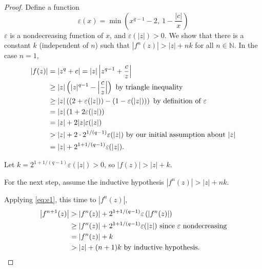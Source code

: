 \documentclass[11pt]{article}
\begin{document}
\begin{proof}
Define a function
\[
\varepsilon(x) = \min\left(x^{q-1} - 2,\ 1 - \frac{|c|}{x}\right)
\]
\( \varepsilon \) is a nondecreasing function of \( x \), and \( \varepsilon(|z|) > 0 \).
We show that there is a constant \( k \) (independent of \( n \)) such that
\( |f^n(z)| > |z| + n k \) for all \( n \in \mathbb{N} \). In the case \( n = 1 \),
\begin{equation} \label{eq:e1}
\begin{aligned}
|f(z)| &= \left| z^q + c \right| = |z| \left| z^{q-1} + \frac{c}{z} \right| \\
&\geq |z| \left( |z|^{q-1} - {\left|\frac{c}{z}\right|} \right) \text{ by triangle inequality} \\
&\geq |z| \left( \left(2 + \varepsilon(|z|) \right) - \left(1 - \varepsilon(|z|)\right) \right)
 \text{ by definition of \( \varepsilon \)} \\
&= |z| \left(1 + 2 \varepsilon(|z|) \right) \\
&= |z| + 2 |z| \varepsilon(|z|) \\
&> |z| + 2 \cdot 2^{{1/(q-1)}} \varepsilon(|z|) \text{ by our initial assumption about } |z| \\
&= |z| + 2^{1 + {1/(q-1)}} \varepsilon(|z|).
\end{aligned}
\end{equation}

Let \( k = 2^{1 + {1/(q-1)}} \varepsilon(|z|) > 0 \), so \( |f(z)| > |z| + k \).
\parskip 6pt

For the next step, assume the inductive hypothesis \( |f^n(z)| > |z| + n k \).

Applying \eqref{eq:e1}, this time to \( |f^n(z)| \),
\begin{equation} \label{eq:e2}
\begin{aligned}
\left|f^{n+1}(z)\right| 
&> \left|f^n(z)\right| +  2^{1 + {1/(q-1)}} \varepsilon\left( \left|f^n(z)\right| \right) \\
&\geq \left|f^n(z)\right| + 2^{1 + {1/(q-1)}} \varepsilon(|z|) \text{ since \( \varepsilon \) nondecreasing} \\
&= \left|f^n(z)\right| + k \\
&> |z| + (n+1)k \text{ by inductive hypothesis.}
\end{aligned}
\end{equation}
\end{proof}
\end{document}
